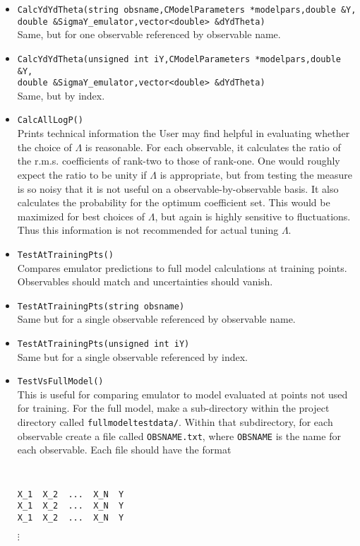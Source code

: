 \documentclass[UserManual.tex]{subfiles}
\begin{document}
\begin{itemize}
\item {\tt CalcYdYdTheta(string obsname,CModelParameters *modelpars,double \&Y,\\double \&SigmaY\_emulator,vector<double> \&dYdTheta)}\\
Same, but for one observable referenced by observable name.
\item {\tt CalcYdYdTheta(unsigned int iY,CModelParameters *modelpars,double \&Y,\\double \&SigmaY\_emulator,vector<double> \&dYdTheta)}\\
Same, but by index.
\item {\tt CalcAllLogP()}\\
Prints technical information the User may find helpful in evaluating whether the choice of $\Lambda$ is reasonable. For each observable, it calculates the ratio of the r.m.s. coefficients of rank-two to those of rank-one. One would roughly expect the ratio to be unity if $\Lambda$ is appropriate, but from testing the measure is so noisy that it is not useful on a observable-by-observable basis. It also calculates the probability for the optimum coefficient set. This would be maximized for best choices of $\Lambda$, but again is highly sensitive to fluctuations. Thus this information is not recommended for actual tuning $\Lambda$. 
\item {\tt TestAtTrainingPts()}\\
Compares emulator predictions to full model calculations at training points. Observables should match and uncertainties should vanish.
\item {\tt TestAtTrainingPts(string obsname)}\\
Same but for a single observable referenced by observable name.
\item {\tt TestAtTrainingPts(unsigned int iY)}\\
Same but for a single observable referenced by index.
\item {\tt TestVsFullModel()}\\
This is useful for comparing emulator to model evaluated at points not used for training. For the full model, make a sub-directory within the project directory called {\tt fullmodeltestdata/}. Within that subdirectory, for each observable create a file called {\tt OBSNAME.txt}, where {\tt OBSNAME} is the name for each observable. Each file should have the format
{\tt
\begin{verbatim}
X_1  X_2  ...  X_N  Y
X_1  X_2  ...  X_N  Y
X_1  X_2  ...  X_N  Y
\end{verbatim}}
\hspace*{36pt}$\vdots$


\end{itemize}
\end{document}

